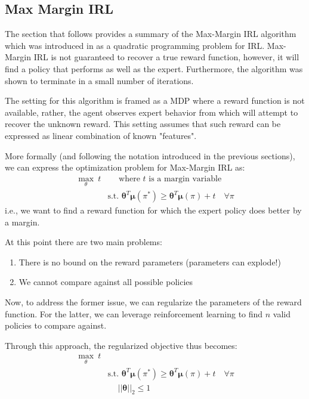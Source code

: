 \documentclass[11pt]{article}
\begin{document}
\subsection{Max Margin IRL}

The section that follows provides a summary of the Max-Margin IRL algorithm which was introduced in \cite{MMIRL} as a quadratic programming problem for IRL. Max-Margin IRL is not guaranteed to recover a true reward function, however, it will find a policy that performs as well as the expert. Furthermore, the algorithm was shown to terminate in a small number of iterations.  

The setting for this algorithm is framed as a MDP where a reward function is not available, rather, the agent observes expert behavior from which will attempt to recover the unknown reward. This setting assumes that such reward can be expressed as linear combination of known "features". 

More formally (and following the notation introduced in the previous sections), we can express the optimization problem for Max-Margin IRL as:
\begin{equation}
    \begin{split}
    \max_\theta ~t& \quad \text{ where $t$ is a margin variable}\\
    &\text{s.t. } \boldsymbol{\theta}^T \boldsymbol{\mu}(\pi^\ast) \geq \boldsymbol{\theta}^T \boldsymbol{\mu}(\pi) + t \quad \forall \pi
    \end{split}
\end{equation}
i.e., we want to find a reward function for which the expert policy does better by a margin. 

At this point there are two main problems:
\begin{enumerate}
    \item There is no bound on the reward parameters (parameters can explode!)
    \item We cannot compare against all possible policies
\end{enumerate}

Now, to address the former issue, we can regularize the parameters of the reward function. For the latter, we can leverage reinforcement learning to find $n$ valid policies to compare against. 

Through this approach, the regularized objective thus becomes:
\begin{equation}
    \begin{split}
    \max_\theta ~t& \\
    &\text{s.t. } \boldsymbol{\theta}^T \boldsymbol{\mu}(\pi^\ast) \geq \boldsymbol{\theta}^T \boldsymbol{\mu}(\pi) + t \quad \forall \pi \\
    &\quad ~||\boldsymbol{\theta}||_2 \leq 1
    \end{split}
\end{equation}
\end{document}
